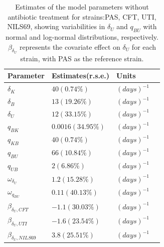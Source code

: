 \documentclass{article}
\begin{document}
\begin{table}
	\begin{tabular}{|l|l|l|l|}
		\hline
		Parameter & Estimates(r.s.e.) & Units\\ \hline
		$\delta_{K}$ & $40(0.74\%)$ & $(days)^{-1}$\\
		$\delta_{B}$ & $13(19.26\%)$ & $(days)^{-1}$\\
		$\delta_{U}$ & $12(33.15\%)$ & $(days)^{-1}$\\
		$q_{BK}$ & $ 0.0016(34.95\%)$ & $(days)^{-1}$\\
		$q_{KB}$ & $40(0.74\%)$ & $(days)^{-1}$\\
		$q_{BU}$ & $66(10.84\%)$ & $(days)^{-1}$\\
		$q_{UB}$ & $2(6.86\%)$ & $(days)^{-1}$\\
		$\omega_{\delta_{U}}$ & $1.2(15.28\%)$ & $(days)^{-1}$\\
		$\omega_{q_{BU}}$ & $0.11(40.13\%)$ & $(days)^{-1}$\\
		$\beta_{\delta_{U}, CFT}$ & $-1.1 (30.03\%)$ & $(days)^{-1}$\\
		$\beta_{\delta_{U}, UTI}$ & $-1.6 (23.54\%)$ & $(days)^{-1}$\\
		$\beta_{\delta_{U}, NILS69}$ & $3.8 (25.51\%)$ & $(days)^{-1}$\\
		\hline
	\end{tabular}
	\label{tab:FinalModelALLStrains}
	\caption{Estimates of the model parameters without antibiotic treatment for strains:PAS, CFT, UTI, NILS69, showing variabilities in $\delta_U$ and $q_{BU}$ with normal and log-normal distributions, respectively. $\beta_{\delta_U}$ represents the covariate effect on $\delta_U$ for each strain, with PAS as the reference strain.}
\end{table}
\end{document}
